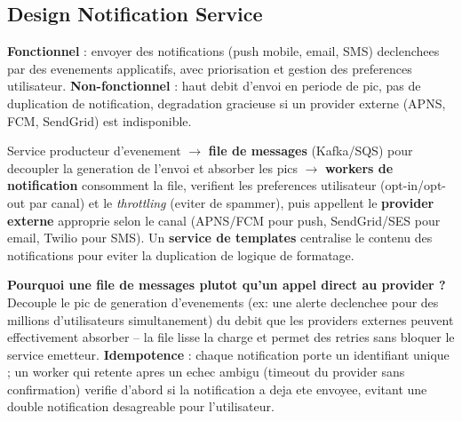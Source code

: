 \documentclass[11pt,a4paper]{article}
\newenvironment{sujet}[1]{%
  \subsection{#1}
}{%
  \bigskip
}
\begin{document}
\begin{sujet}{Design Notification Service}

\begin{req}
\textbf{Fonctionnel} : envoyer des notifications (push mobile, email, SMS) declenchees par des evenements applicatifs, avec priorisation et gestion des preferences utilisateur. \textbf{Non-fonctionnel} : haut debit d'envoi en periode de pic, pas de duplication de notification, degradation gracieuse si un provider externe (APNS, FCM, SendGrid) est indisponible.
\end{req}

\begin{archbox}
Service producteur d'evenement $\to$ \textbf{file de messages} (Kafka/SQS) pour decoupler la generation de l'envoi et absorber les pics $\to$ \textbf{workers de notification} consomment la file, verifient les preferences utilisateur (opt-in/opt-out par canal) et le \emph{throttling} (eviter de spammer), puis appellent le \textbf{provider externe} approprie selon le canal (APNS/FCM pour push, SendGrid/SES pour email, Twilio pour SMS). Un \textbf{service de templates} centralise le contenu des notifications pour eviter la duplication de logique de formatage.
\end{archbox}

\begin{tradeoff}
\textbf{Pourquoi une file de messages plutot qu'un appel direct au provider ?} Decouple le pic de generation d'evenements (ex: une alerte declenchee pour des millions d'utilisateurs simultanement) du debit que les providers externes peuvent effectivement absorber -- la file lisse la charge et permet des retries sans bloquer le service emetteur. \textbf{Idempotence} : chaque notification porte un identifiant unique ; un worker qui retente apres un echec ambigu (timeout du provider sans confirmation) verifie d'abord si la notification a deja ete envoyee, evitant une double notification desagreable pour l'utilisateur.
\end{tradeoff}

\end{sujet}
\end{document}
